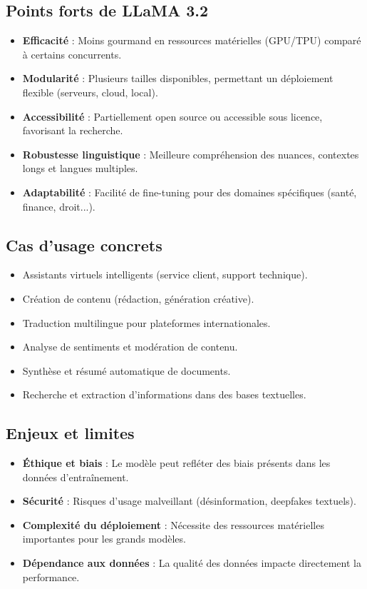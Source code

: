 \subsection{Points forts de LLaMA 3.2}
\begin{itemize}
    \item \textbf{Efficacité} : Moins gourmand en ressources matérielles (GPU/TPU) comparé à certains concurrents.
    \item \textbf{Modularité} : Plusieurs tailles disponibles, permettant un déploiement flexible (serveurs, cloud, local).
    \item \textbf{Accessibilité} : Partiellement open source ou accessible sous licence, favorisant la recherche.
    \item \textbf{Robustesse linguistique} : Meilleure compréhension des nuances, contextes longs et langues multiples.
    \item \textbf{Adaptabilité} : Facilité de fine-tuning pour des domaines spécifiques (santé, finance, droit...).
\end{itemize}

\subsection{Cas d’usage concrets}
\begin{itemize}
    \item Assistants virtuels intelligents (service client, support technique).
    \item Création de contenu (rédaction, génération créative).
    \item Traduction multilingue pour plateformes internationales.
    \item Analyse de sentiments et modération de contenu.
    \item Synthèse et résumé automatique de documents.
    \item Recherche et extraction d’informations dans des bases textuelles.
\end{itemize}

\subsection{Enjeux et limites}
\begin{itemize}
    \item \textbf{Éthique et biais} : Le modèle peut refléter des biais présents dans les données d’entraînement.
    \item \textbf{Sécurité} : Risques d’usage malveillant (désinformation, deepfakes textuels).
    \item \textbf{Complexité du déploiement} : Nécessite des ressources matérielles importantes pour les grands modèles.
    \item \textbf{Dépendance aux données} : La qualité des données impacte directement la performance.
\end{itemize}

